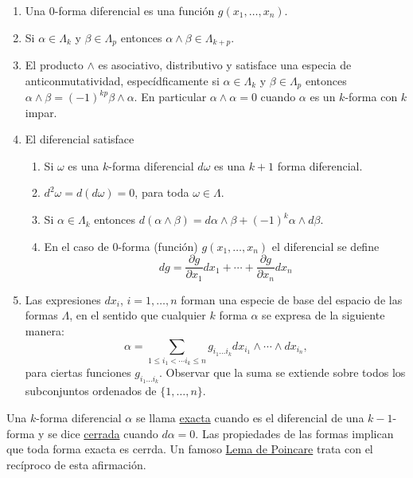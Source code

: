 \documentclass{article}
\begin{document}
\begin{enumerate}
   \item Una 0-forma diferencial es una función $g(x_1,\ldots,x_n)$.

  \item Si $\alpha\in\Lambda_k$ y $\beta\in\Lambda_p$ entonces $\alpha \wedge \beta\in \Lambda_{k+p}$.
  \item El producto $\wedge$ es asociativo, distributivo y satisface una especia de anticonmutatividad, especídficamente si $\alpha\in\Lambda_k$ y $\beta\in\Lambda_p$ entonces $\alpha\wedge \beta=(-1)^{kp}\beta\wedge\alpha$. En particular $\alpha\wedge\alpha=0$ cuando $\alpha$ es un $k$-forma con $k$ impar.
  \item El diferencial satisface
  \begin{enumerate}
    \item Si $\omega$ es una $k$-forma diferencial $d\omega$ es una $k+1$ forma diferencial.
    \item  $d^2\omega=d(d\omega)=0$, para toda $\omega\in\Lambda$.
    \item Si $\alpha\in\Lambda_k$ entonces  $d(\alpha\wedge\beta)=d\alpha\wedge\beta+(-1)^k\alpha\wedge d\beta$.
    \item En el caso de $0$-forma (función) $g(x_1,\ldots,x_n)$ el diferencial se define
    \[dg=\frac{\partial g}{\partial x_1}dx_1+\cdots+\frac{\partial g}{\partial x_n}dx_n\]

  \end{enumerate}
  \item Las expresiones $dx_i$, $i=1,\ldots,n$ forman una especie de base del espacio de las formas $\Lambda$, en el sentido que cualquier $k$ forma $\alpha$ se expresa de la siguiente manera:
  \[\alpha=\sum_{1\leq i_1<\cdots i_k\leq n}g_{i_1\ldots i_k} dx_{i_1}\wedge\cdots\wedge dx_{i_n},\]
  para ciertas funciones $g_{i_1\ldots i_k}$. Observar que la suma se extiende sobre todos los subconjuntos ordenados de $\{1,\ldots,n\}$.
\end{enumerate}


Una $k$-forma diferencial $\alpha$ se llama \href{https://es.wikipedia.org/wiki/Formas_diferenciales_cerradas_y_exactas}{exacta} cuando es el diferencial de una $k-1$-forma y se dice \href{https://es.wikipedia.org/wiki/Formas_diferenciales_cerradas_y_exactas}{cerrada} cuando $d\alpha=0$. Las propiedades de las formas implican que toda forma exacta es cerrda. Un famoso \href{https://es.wikipedia.org/wiki/Formas_diferenciales_cerradas_y_exactas#Lema_de_Poincar.C3.A9}{Lema de Poincare} trata con el recíproco de esta afirmación.
\end{document}
